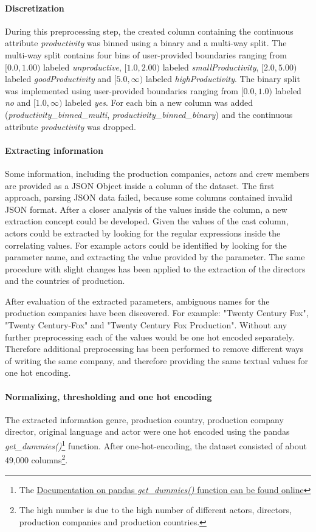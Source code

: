 \paragraph{Discretization}
During this preprocessing step, the created column containing the continuous attribute \textit{productivity} was binned using a binary and a multi-way split. The multi-way split contains four bins of user-provided boundaries ranging from $[0.0, 1.00)$ labeled \textit{unproductive}, $[1.0, 2.00)$ labeled \textit{smallProductivity}, $[2.0, 5.00)$ labeled \textit{goodProductivity} and $[5.0, \infty)$ labeled \textit{highProductivity}. The binary split was implemented using user-provided boundaries ranging from $[0.0, 1.0)$ labeled \textit{no} and $[1.0, \infty)$ labeled \textit{yes}. For each bin a new column was added (\textit{productivity\_binned\_multi}, \textit{productivity\_binned\_binary}) and the continuous attribute \textit{productivity} was dropped.

\paragraph{Extracting information}
Some information, including the production companies, actors and crew members are provided as a JSON Object inside a column of the dataset. The first approach, parsing  JSON data failed, because  some columns contained invalid JSON format. After a closer analysis of the values inside the column, a new extraction concept could be developed. Given the values of the cast column, actors could be extracted by looking for the regular expressions inside the correlating values. For example actors could be identified by looking for the parameter name, and extracting the value provided by the parameter. The same procedure with slight changes has been applied to the extraction of the directors and the countries of production.

After evaluation of the extracted parameters, ambiguous names for the production companies have been discovered. For example: "Twenty Century Fox", "Twenty Century-Fox" and "Twenty Century Fox Production". Without any further preprocessing each of the values would be one hot encoded separately. Therefore additional preprocessing has been performed to remove different ways of writing the same company, and therefore providing the same textual values for one hot encoding.

\paragraph{Normalizing, thresholding and one hot encoding}
The extracted information genre, production country, production company director, original language  and actor were one hot encoded using the pandas \textit{get\_dummies()}\footnote{The \hyperref{https://pandas.pydata.org/pandas-docs/stable/generated/pandas.get_dummies.html}{documentation}{pd.getDumies}{Documentation on pandas \textit{get\_dummies()} function can be found online}} function. After one-hot-encoding, the dataset consisted of about 49,000 columns\footnote{The high number is due to the high number of different actors, directors, production companies and production countries.}.


